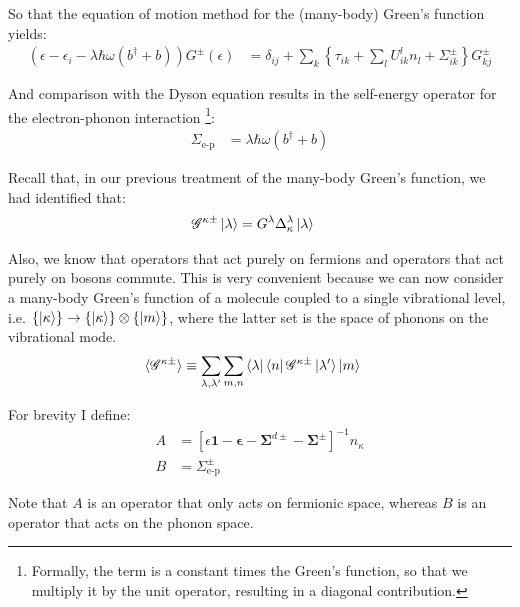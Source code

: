 So that the equation of motion method for the (many-body) Green's function yields:
\begin{align*}
\left(\epsilon-\epsilon_i - \lambda \hbar \omega \left(b^\dagger + b\right) \right) G^\pm (\epsilon) &= \delta_{ij} + \sum_k \left\{ \tau_{ik} + \sum_l U^l_{ik} n_l + \Sigma^\pm_{ik} \right\} G^\pm_{kj}
\end{align*}

And comparison with the Dyson equation results in the self-energy operator for the electron-phonon interaction \footnote{Formally, the term is a constant times the Green's function, so that we multiply it by the unit operator, resulting in a diagonal contribution.}:
\begin{align*}
\Sigma_\text{e-p} &= \lambda \hbar \omega ( b^\dagger + b)
\end{align*}

Recall that, in our previous treatment of the many-body Green's function, we had identified that:
\begin{align*}
\mathscr{G}^{\kappa\pm} \ket{\lambda} &= G^\lambda \Delta^\lambda_\kappa \ket{\lambda}
\end{align*}

Also, we know that operators that act purely on fermions and operators that act purely on bosons commute. This is very convenient because we can now consider a many-body Green's function of a molecule coupled to a single vibrational level, i.e. $\left\{\ket{\kappa}\right\} \rightarrow \left\{\ket{\kappa}\right\} \otimes \left\{\ket{m}\right\}$, where the latter set is the space of phonons on the vibrational mode.
\begin{align*}
\braket{\mathscr{G}^{\kappa\pm}} &\equiv \sum_{\lambda, \lambda^\prime} \sum_{m,n} \bra{\lambda}\bra{n} \mathscr{G}^{\kappa\pm} \ket{\lambda^\prime}\ket{m} 
\end{align*}

For brevity I define:
\begin{align*}
A &=\left[ \epsilon \mathbf{1} - \mathbf{\epsilon} - \mathbf{\Sigma}^{d\pm} - \mathbf{\Sigma}^\pm \right]^{-1} n_\kappa \\
B &= \Sigma^\pm_\text{e-p}
\end{align*}

Note that $A$ is an operator that only acts on fermionic space, whereas $B$ is an operator that acts on the phonon space. 

